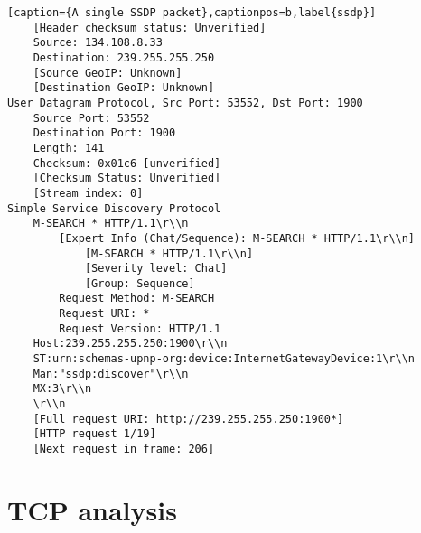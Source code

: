 \begin{lstlisting}[caption={A single SSDP packet},captionpos=b,label{ssdp}]
	[Header checksum status: Unverified]
	Source: 134.108.8.33
	Destination: 239.255.255.250
	[Source GeoIP: Unknown]
	[Destination GeoIP: Unknown]
User Datagram Protocol, Src Port: 53552, Dst Port: 1900
	Source Port: 53552
	Destination Port: 1900
	Length: 141
	Checksum: 0x01c6 [unverified]
	[Checksum Status: Unverified]
	[Stream index: 0]
Simple Service Discovery Protocol
	M-SEARCH * HTTP/1.1\r\\n
		[Expert Info (Chat/Sequence): M-SEARCH * HTTP/1.1\r\\n]
			[M-SEARCH * HTTP/1.1\r\\n]
			[Severity level: Chat]
			[Group: Sequence]
		Request Method: M-SEARCH
		Request URI: *
		Request Version: HTTP/1.1
	Host:239.255.255.250:1900\r\\n
	ST:urn:schemas-upnp-org:device:InternetGatewayDevice:1\r\\n
	Man:"ssdp:discover"\r\\n
	MX:3\r\\n
	\r\\n
	[Full request URI: http://239.255.255.250:1900*]
	[HTTP request 1/19]
	[Next request in frame: 206]

\end{lstlisting}
\chapter{TCP analysis}
\label{tcp}

